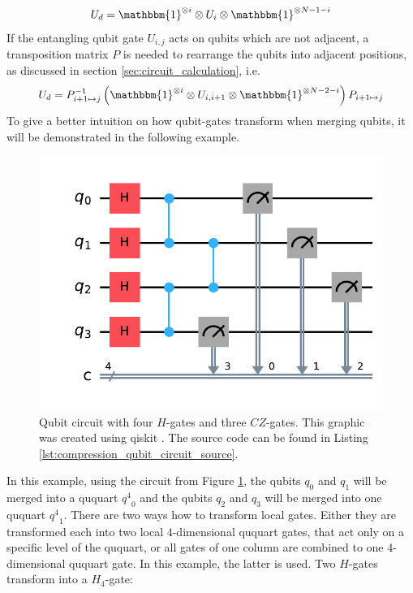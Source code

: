     \begin{equation}
      \label{eq:local_qubit_gate_to_qudit_gate}
      U_d=\mathbbm{1}^{\otimes i}\otimes U_i\otimes\mathbbm{1}^{\otimes N-1-i}
    \end{equation}
    If the entangling qubit gate $U_{i,j}$ acts on qubits which are not adjacent, a transposition matrix $P$ is needed to rearrange the qubits into adjacent positions, as discussed in section \ref{sec:circuit_calculation}, i.e.
    \begin{equation}
      \label{eq:entangling_qubit_gate_to_qudit_gate}
      U_d=P^{-1}_{i+1\mapsto j}\left(\mathbbm{1}^{\otimes i}\otimes U_{i, i+1}\otimes \mathbbm{1}^{\otimes N-2-i}\right)P_{i+1\mapsto j}
    \end{equation}
    To give a better intuition on how qubit-gates transform when merging qubits, it will be demonstrated in the following example.
    \begin{figure}[H]
      \centering
      \includegraphics[width=.7\linewidth]{figures/qubit_circuit.pdf}
      \caption{Qubit circuit with four $H$-gates and three $CZ$-gates. This graphic was created using qiskit \cite{qiskit2024}. The source code can be found in Listing \ref{lst:compression_qubit_circuit_source}.}
      \label{fig:compression_qubit_circuit}
    \end{figure}
    In this example, using the circuit from Figure \ref{fig:compression_qubit_circuit}, the qubits $q_0$ and $q_1$ will be merged into a ququart ${q^4}_0$ and the qubits $q_2$ and $q_3$ will be merged into one ququart ${q^4}_1$. There are two ways how to transform local gates. Either they are transformed each into two local $4$-dimensional ququart gates, that act only on a specific level of the ququart, or all gates of one column are combined to one $4$-dimensional ququart gate. In this example, the latter is used. Two $H$-gates transform into a $H_4$-gate:
